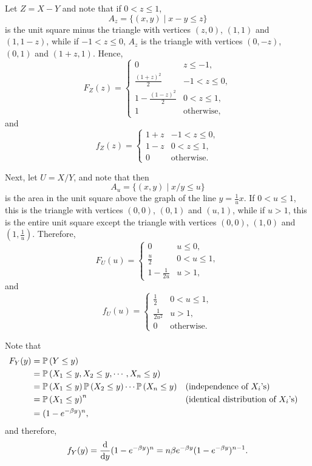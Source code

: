 \begin{ex}
  Let $Z=X-Y$ and note that if $0<z\leq 1$,
  \[
    A_z=\{(x,y)\mid x-y\leq z\}
  \]
  is the unit square minus the triangle with vertices $(z,0)$, $(1,1)$ and
  $(1,1-z)$, while if $-1<z\leq 0$, $A_z$ is the triangle with vertices
  $(0, -z)$, $(0, 1)$ and $(1+z,1)$. Hence,
  \[
    F_Z(z)=\begin{cases}
      0                   & z\leq -1,         \\
      \frac{(1+z)^2}{2}   & -1<z\leq 0,       \\
      1-\frac{(1-z)^2}{2} & 0<z\leq 1,        \\
      1                   & \text{otherwise},
    \end{cases}
  \]
  and
  \[
    f_Z(z)=\begin{cases}
      1+z & -1<z\leq 0,       \\
      1-z & 0<z\leq 1,        \\
      0   & \text{otherwise}.
    \end{cases}
  \]

  Next, let $U=X/Y$, and note that then
  \[
    A_u=\{(x,y)\mid x/y\leq u\}
  \]
  is the area in the unit square above the graph of the line $y=\frac{1}{u}x$.
  If $0<u\leq 1$, this is the triangle with vertices $(0,0)$, $(0, 1)$ and
  $(u, 1)$, while if $u>1$, this is the entire unit square except the triangle
  with vertices $(0, 0)$, $(1, 0)$ and $\left(1, \frac{1}{u}\right)$. Therefore,
  \[
    F_U(u)=\begin{cases}
      0              & u\leq 0,   \\
      \frac{u}{2}    & 0<u\leq 1, \\
      1-\frac{1}{2u} & u> 1,
    \end{cases}
  \]
  and
  \[
    f_U(u)=\begin{cases}
      \frac{1}{2}    & 0<u\leq 1,        \\
      \frac{1}{2u^2} & u>1,              \\
      0              & \text{otherwise}.
    \end{cases}
  \]
\end{ex}

\begin{ex}
  Note that
  \begin{align*}
    F_Y(y)
     & =\P{Y\leq y}                                                                                   \\
     & =\P{X_1\leq y, X_2\leq y, \cdots, X_n\leq y}                                                   \\
     & =\P{X_1\leq y}\P{X_2\leq y}\cdots\P{X_n\leq y} &  & \text{(independence of $X_i$'s)}           \\
     & =\P{X_1\leq y}^n                               &  & \text{(identical distribution of $X_i$'s)} \\
     & =(1-e^{-\beta y})^n,
  \end{align*}
  and therefore,
  \[
    f_Y(y)
    =\frac{\d}{\d{y}} (1-e^{-\beta y})^n
    =n\beta e^{-\beta y}(1-e^{-\beta y})^{n-1}.
  \]
\end{ex}